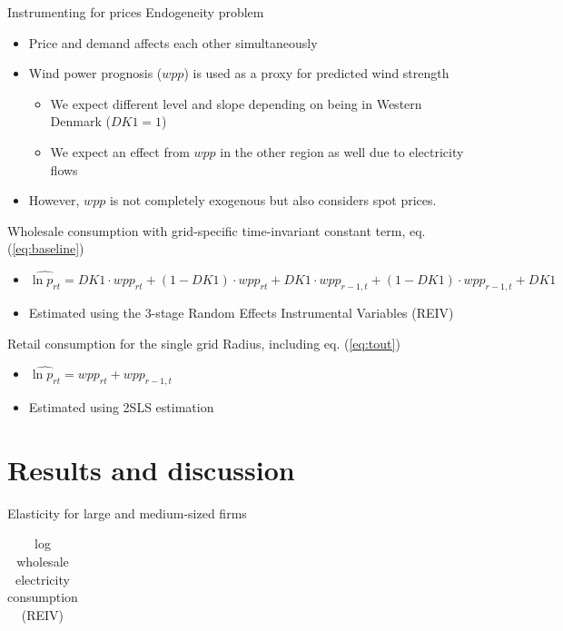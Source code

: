 \begin{frame}{Instrumenting for prices}
Endogeneity problem
\begin{itemize}
    \item Price and demand affects each other simultaneously
    \item Wind power prognosis ($wpp$) is used as a proxy for predicted wind strength
    \begin{itemize}
        \item We expect different level and slope depending on being in Western Denmark ($DK1=1$)
        \item We expect an effect from $wpp$ in the other region as well due to electricity flows
    \end{itemize}
    \item However, $wpp$ is not completely exogenous but also considers spot prices.
\end{itemize}
Wholesale consumption with grid-specific time-invariant constant term, eq. (\ref{eq:baseline})
\begin{itemize}
    \item $\hat{\ln p_{rt}}=DK1\cdot wpp_{rt}+(1-DK1)\cdot wpp_{rt}+DK1\cdot wpp_{r-1,t}+(1-DK1)\cdot wpp_{r-1,t}+DK1$
    \item Estimated using the 3-stage Random Effects Instrumental Variables (REIV)
\end{itemize}
Retail consumption for the single grid Radius, including eq. (\ref{eq:tout})
\begin{itemize}
    \item $\hat{\ln p_{rt}}=wpp_{rt}+wpp_{r-1,t}$
    \item Estimated using 2SLS estimation
\end{itemize}
\end{frame}


\section{Results and discussion}

\begin{frame}{Elasticity for large and medium-sized firms}
\begin{table}[H]
  \vspace{-0.0cm}
  \centering
  \caption{log wholesale electricity consumption (REIV)}
  \footnotesize
    \begin{tabular}{lcccc}
      \toprule
        
    \end{tabular}
  \label{tab:ws_preferred}
  \vspace{-0.0cm}
\end{table}
\end{frame}

